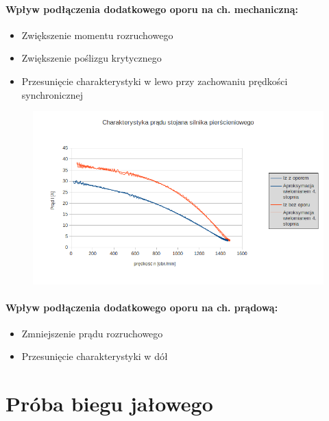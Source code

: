 \documentclass[12pt]{article}
\newcommand{\ZMa}{17}
\begin{document}
\paragraph{Wpływ podłączenia dodatkowego oporu na ch. mechaniczną:}
\begin{itemize}
	\item Zwiększenie momentu rozruchowego
	\item Zwiększenie poślizgu krytycznego
	\item Przesunięcie charakterystyki w lewo przy zachowaniu prędkości synchronicznej
\end{itemize}
	\begin{figure}[H]
	\centering
	\includegraphics[width=\ZMa cm]{wykresy/ch_pradowa_pierscieniowy}
	\end{figure}
\paragraph{Wpływ podłączenia dodatkowego oporu na ch. prądową:}
	\begin{itemize}
	\item Zmniejszenie prądu rozruchowego
	\item Przesunięcie charakterystyki w dół
\end{itemize}

\section{Próba biegu jałowego}
\end{document}
